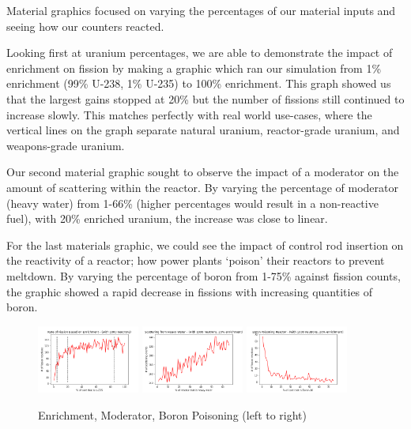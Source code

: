 \documentclass{notes}
\begin{document}
Material graphics focused on varying the percentages of our material inputs and seeing how our counters reacted.

Looking first at uranium percentages, we are able to demonstrate the impact of enrichment on fission by making a graphic which ran our simulation from 1\% enrichment (99\% U-238, 1\% U-235) to 100\% enrichment. This graph showed us that the largest gains stopped at 20\% but the number of fissions still continued to increase slowly. This matches perfectly with real world use-cases, where the vertical lines on the graph separate natural uranium, reactor-grade uranium, and weapons-grade uranium.

Our second material graphic sought to observe the impact of a moderator on the amount of scattering within the reactor. By varying the percentage of moderator (heavy water) from 1-66\% (higher percentages would result in a non-reactive fuel), with 20\% enriched uranium, the increase was close to linear.

For the last materials graphic, we could see the impact of control rod insertion on the reactivity of a reactor; how power plants `poison' their reactors to prevent meltdown. By varying the percentage of boron from 1-75\% against fission counts, the graphic showed a rapid decrease in fissions with increasing quantities of boron.

\begin{figure}[H]
    \centering
    \includegraphics[width = 0.3\textwidth]{enrichment.png}
    \includegraphics[width = 0.3\textwidth]{heavy_water.png}
    \includegraphics[width = 0.3\textwidth]{boron.png}
    \caption{Enrichment, Moderator, Boron Poisoning (left to right)}
\end{figure}
\end{document}
